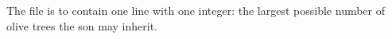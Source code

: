 The file is to contain one line with one integer: the largest possible number of olive trees the son may inherit. 
